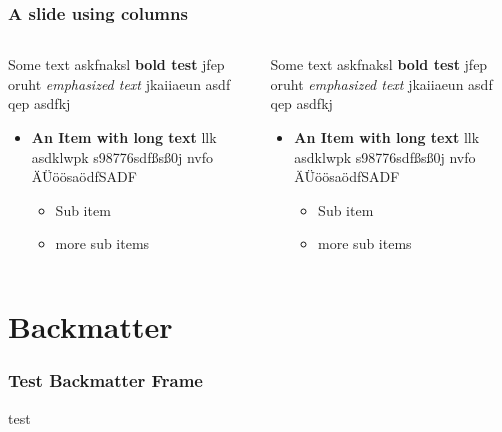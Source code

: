 \documentclass[german,aspectratio=169,notoc,titlestyle=tud,draft]{tudbeamer}%
\begin{document}
\begin{frame}
	\frametitle{A slide using columns}
	\begin{columns}
	   	\begin{column}{.5\textwidth}
	   		Some text askfnaksl \textbf{bold test} jfep oruht \emph{emphasized text} jkaiiaeun asdf qep  asdfkj  
	   		\begin{itemize}
	   			\item \textbf{An Item with long text} llk asdklwpk s98776sdfßsß0j nvfo ÄÜöösaödfSADF
	   			\begin{itemize}
	   				\item Sub item
	   				\item more sub items
	   			\end{itemize}
	   		\end{itemize}
		\end{column}
	   	\begin{column}{.5\textwidth}
	   		Some text askfnaksl \textbf{bold test} jfep oruht \emph{emphasized text} jkaiiaeun asdf qep  asdfkj  
	   		\begin{itemize}
	   			\item \textbf{An Item with long text} llk asdklwpk s98776sdfßsß0j nvfo ÄÜöösaödfSADF
	   			\begin{itemize}
	   				\item Sub item
	   				\item more sub items
	   			\end{itemize}
	   		\end{itemize}
		\end{column}
	\end{columns}
\end{frame}

%
%

\disableSectionFrame%
\section*{Backmatter}
\begin{finalframe}[]
	\frametitle*{Test Backmatter Frame}
	test
\end{finalframe}

\end{document}
